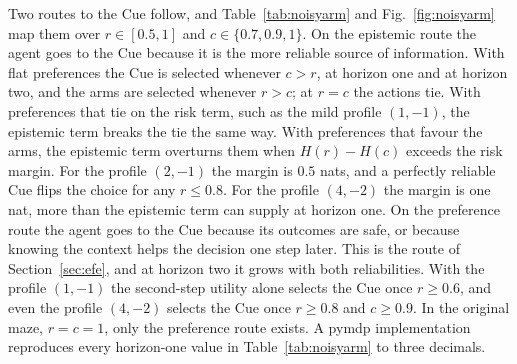 \documentclass[letterpaper]{article} %
\theoremstyle{definition}
\begin{document}
Two routes to the Cue follow, and Table~\ref{tab:noisyarm} and Fig.~\ref{fig:noisyarm} map them over $r \in [0.5, 1]$ and $c \in \{0.7, 0.9, 1\}$. On the epistemic route the agent goes to the Cue because it is the more reliable source of information. With flat preferences the Cue is selected whenever $c > r$, at horizon one and at horizon two, and the arms are selected whenever $r > c$; at $r = c$ the actions tie. With preferences that tie on the risk term, such as the mild profile $(1,-1)$, the epistemic term breaks the tie the same way. With preferences that favour the arms, the epistemic term overturns them when $H(r) - H(c)$ exceeds the risk margin. For the profile $(2,-1)$ the margin is $0.5$ nats, and a perfectly reliable Cue flips the choice for any $r \le 0.8$. For the profile $(4,-2)$ the margin is one nat, more than the epistemic term can supply at horizon one. On the preference route the agent goes to the Cue because its outcomes are safe, or because knowing the context helps the decision one step later. This is the route of Section~\ref{sec:efe}, and at horizon two it grows with both reliabilities. With the profile $(1,-1)$ the second-step utility alone selects the Cue once $r \ge 0.6$, and even the profile $(4,-2)$ selects the Cue once $r \ge 0.8$ and $c \ge 0.9$. In the original maze, $r = c = 1$, only the preference route exists. A pymdp implementation reproduces every horizon-one value in Table~\ref{tab:noisyarm} to three decimals.
\end{document}
